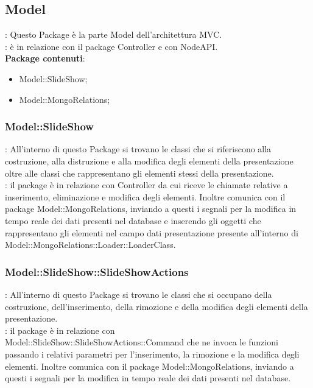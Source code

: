 \subsection{Model}{
	\textbf{\tipo}: Questo Package è la parte Model dell'architettura MVC.\\
	\textbf{\relaz}: è in relazione con il package Controller e con NodeAPI.\\
	\textbf{Package contenuti}: 
	\begin{itemize}
	\item Model::\-SlideShow;
    \item Model::\-MongoRelations;
	\end{itemize}
}
\subsubsection{Model::\-SlideShow}{
		\textbf{\tipo}: All’interno di questo Package si trovano le classi che si riferiscono alla costruzione, alla distruzione e alla modifica degli elementi della presentazione oltre alle classi che rappresentano gli elementi stessi della presentazione.\\
        \textbf{\relaz}: il package è in relazione con Controller da cui riceve le chiamate relative a inserimento, eliminazione e modifica degli elementi. Inoltre comunica con il package Model::\-MongoRelations, inviando a questi i segnali per la modifica in tempo reale dei dati presenti nel database e inserendo gli oggetti che rappresentano gli elementi nel campo dati presentazione presente all'interno di Model::\-MongoRelations::\-Loader::\-LoaderClass.\\
    }
\subsubsection{Model::\-SlideShow::\-SlideShowActions}{
		\textbf{\tipo}: All’interno di questo Package si trovano le classi che si occupano della costruzione, dell'inserimento, della rimozione e della modifica degli elementi della presentazione.\\
        \textbf{\relaz}: il package è in relazione con\\ Model::\-SlideShow::\-SlideShowActions::\-Command che ne invoca le funzioni passando i relativi parametri per l'inserimento, la rimozione e la modifica degli elementi. Inoltre comunica con il package Model::\-MongoRelations, inviando a questi i segnali per la modifica in tempo reale dei dati presenti nel database.\\
    }
    
